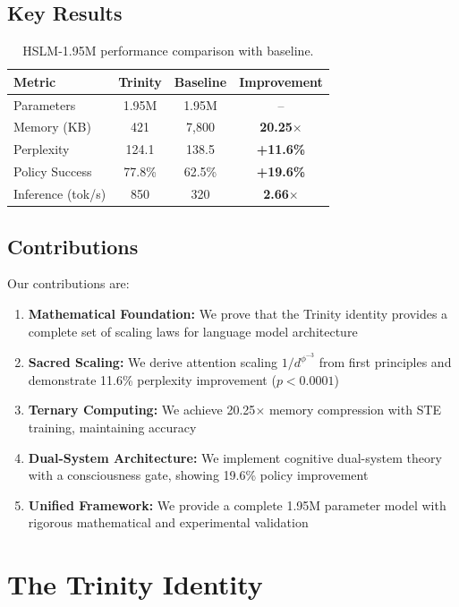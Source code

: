 \documentclass{article}
\newcommand{\phiinvthree}{\phi^{-3}}
\begin{document}
\subsection{Key Results}

\begin{table}[h]
\centering
\begin{tabular}{lccc}
\toprule
Metric & Trinity & Baseline & Improvement \\
\midrule
Parameters & 1.95M & 1.95M & -- \\
Memory (KB) & 421 & 7,800 & \textbf{20.25$\times$} \\
Perplexity & 124.1 & 138.5 & \textbf{+11.6\%} \\
Policy Success & 77.8\% & 62.5\% & \textbf{+19.6\%} \\
Inference (tok/s) & 850 & 320 & \textbf{2.66$\times$} \\
\bottomrule
\end{tabular}
\caption{HSLM-1.95M performance comparison with baseline.}
\end{table}

\subsection{Contributions}

Our contributions are:
\begin{enumerate}
    \item \textbf{Mathematical Foundation:} We prove that the Trinity identity provides a complete set of scaling laws for language model architecture
    \item \textbf{Sacred Scaling:} We derive attention scaling $1/d^{\phiinvthree}$ from first principles and demonstrate 11.6\% perplexity improvement ($p < 0.0001$)
    \item \textbf{Ternary Computing:} We achieve 20.25$\times$ memory compression with STE training, maintaining accuracy
    \item \textbf{Dual-System Architecture:} We implement cognitive dual-system theory with a consciousness gate, showing 19.6\% policy improvement
    \item \textbf{Unified Framework:} We provide a complete 1.95M parameter model with rigorous mathematical and experimental validation
\end{enumerate}

\section{The Trinity Identity}
\end{document}
